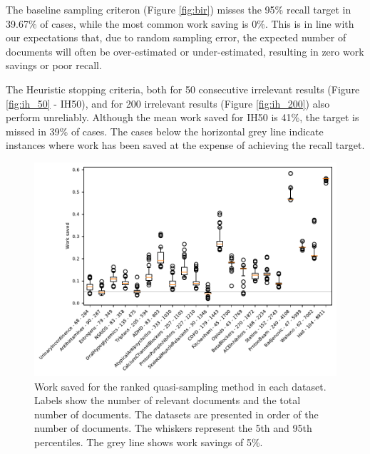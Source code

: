 \documentclass{bmcart}
\begin{document}
	
	
	The baseline sampling criteron (Figure \ref{fig:bir}) misses the 95\% recall target in 39.67\% of cases, while the most common work saving is 0\%. This is in line with our expectations that, due to random sampling error, the expected number of documents will often be over-estimated or under-estimated, resulting in zero work savings or poor recall.
	
	The Heuristic stopping criteria, both for 50 consecutive irrelevant results (Figure \ref{fig:ih_50} - IH50), and for 200 irrelevant results (Figure \ref{fig:ih_200}) also perform unreliably. Although the mean work saved for IH50 is 41\%, the target is missed in 39\% of cases. The cases below the horizontal grey line indicate instances where work has been saved at the expense of achieving the recall target.
	
	\begin{figure}
		\includegraphics[width=0.9\linewidth]{2_figs_wss_nrs.pdf}
		\caption{Work saved for the ranked quasi-sampling method in each dataset. Labels show the number of relevant documents and the total number of documents. The datasets are presented in order of the number of documents. The whiskers represent the 5th and 95th percentiles. The grey line shows work savings of 5\%. }
		\label{wss}
	\end{figure}
	
\end{document}
